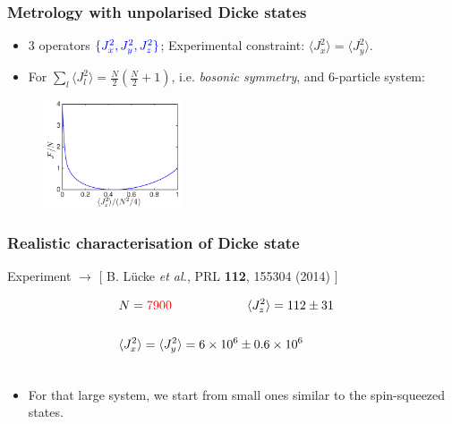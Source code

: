 \documentclass{beamer}
\newcommand{\expect}[1]{\ensuremath{\langle #1 \rangle}}
\newcommand{\citate}[1]{{\footnotesize{\color{gray}[ #1 ]}}

	}
\def\bea{\begin{eqnarray}}
\def\eea{\end{eqnarray}}
\def\nnnl{\nonumber\\}
\begin{document}
		\begin{frame}
			\frametitle{Metrology with unpolarised Dicke states}
			\begin{itemize}
				\item<1-> 3 operators $\color{blue}\{J_x^2,J_y^2,J_z^2\}$; Experimental constraint: $\expect{J_x^2}=\expect{J_y^2}$.
				\vspace{5px}
				\item<2-> For $\sum_l \expect{J_l^2} = \tfrac{N}{2} (\tfrac{N}{2}+1)$, {i.e.} \emph{\color{blue}bosonic symmetry}, and 6-particle system:
			\end{itemize}

			\begin{figure}
				\includegraphics[height=120px]{img/upperboundary-dicke.pdf}
			\end{figure}

		\end{frame}

		\begin{frame}
			\frametitle{Realistic characterisation of Dicke state}
			{\small Experiment $\rightarrow$}
			\citate{B. L\"ucke {\it et al.}, PRL \textbf{112}, 155304 (2014)}

				\begin{block}{}
					\vspace{-1px}
					\bea
					 	&N ={\color{red} 7900} \hspace{60px} \expect{J_z^2}=112\pm 31 &
						\nnnl\nnnl
						&\expect{J_x^2}=\expect{J_y^2}  =  6 \times 10^6 \pm 0.6\times 10^6 &\nnnl
						\nonumber
					\eea
				\end{block}

			\begin{itemize}
				\item For that large system, we start from {\color{blue}small ones} similar to the spin-squeezed states.
			\end{itemize}
		\end{frame}
\end{document}

